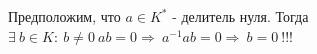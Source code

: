  Предположим, что $a \in K^*$ - делитель нуля. Тогда $\exists \ b \in K: \ b \neq 0 \ ab = 0 \Longrightarrow \ a^{-1}ab = 0 \Longrightarrow \ b = 0 \ !!!$